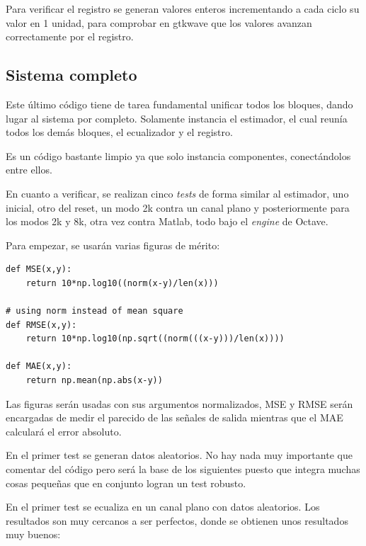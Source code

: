 \documentclass[11pt]{scrartcl} %
\begin{document}
\begin{preview}
Para verificar el registro se generan valores enteros incrementando a cada ciclo su valor en 1 unidad, para comprobar en gtkwave que los valores avanzan correctamente por el registro.

\subsection{Sistema completo}

Este último código tiene de tarea fundamental unificar todos los bloques, dando lugar al sistema por completo. Solamente instancia el estimador, el cual reunía todos los demás bloques, el ecualizador y el registro. 

Es un código bastante limpio ya que solo instancia componentes, conectándolos entre ellos.

En cuanto a verificar, se realizan cinco \emph{tests} de forma similar al estimador, uno inicial, otro del reset, un modo 2k contra un canal plano y posteriormente para los modos 2k y 8k, otra vez contra Matlab, todo bajo el \emph{engine} de Octave.

Para empezar, se usarán varias figuras de mérito:

\begin{verbatim}
def MSE(x,y):
    return 10*np.log10((norm(x-y)/len(x)))

# using norm instead of mean square
def RMSE(x,y):
    return 10*np.log10(np.sqrt((norm(((x-y)))/len(x))))

def MAE(x,y):
    return np.mean(np.abs(x-y))
\end{verbatim}
	
Las figuras serán usadas con sus argumentos normalizados, MSE y RMSE serán encargadas de medir el parecido de las señales de salida mientras que el MAE calculará el error absoluto.

En el primer test se generan datos aleatorios. No hay nada muy importante que comentar del código pero será la base de los siguientes puesto que integra muchas cosas pequeñas que en conjunto logran un test robusto.

En el primer test se ecualiza en un canal plano con datos aleatorios. Los resultados son muy cercanos a ser perfectos, donde se obtienen unos resultados muy buenos:

\vspace{5mm}


\end{preview}
\end{document}
